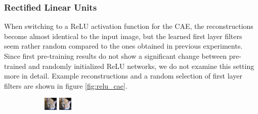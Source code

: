 \documentclass{article}
\begin{document}
    \subsubsection{Rectified Linear Units}

      \label{sec:relu_cae}
      When switching to a ReLU activation function \citep{nair2010rectified} for the CAE, the reconstructions become almost identical to the input image, but the learned first layer filters seem rather random compared to the ones obtained in previous experiments. Since first pre-training results do not show a significant change between pre-trained and randomly initialized ReLU networks, we do not examine this setting more in detail. Example reconstructions and a random selection of first layer filters are shown in figure \ref{fig:relu_cae}.

      \begin{figure}[b]

      \centering

				\begin{subfigure}{0.4\linewidth}

					\centering
					\includegraphics[width=0.4\linewidth]{../graphics/reconstructions/cifar/relu/input_00_relu.png}
					\includegraphics[width=0.4\linewidth]{../graphics/reconstructions/cifar/relu/reconstruction_00_relu.png}

				\end{subfigure}
				\begin{subfigure}{0.4\linewidth}


\end{subfigure}
\end{figure}
\end{document}

